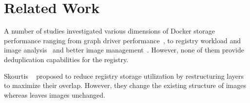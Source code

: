 \section{Related Work}
\label{sec:related}


A number of studies investigated various dimensions of Docker storage
performance ranging from graph driver performance~\cite{slacker,docker-driver-eval,improve-cow-container-drivers}, to registry workload and image analysis~\cite{dockerworkload,dedupanalysis}
and better image management~\cite{shifter,exoclones}. However, none
of them provide deduplication capabilities for the registry.

Skourtis \etal~\cite{skourtis2019carving} proposed to reduce registry storage utilization by
restructuring layers to maximize their overlap. However, they change
the existing structure of images whereas \sysname leaves images unchanged.
%
%

